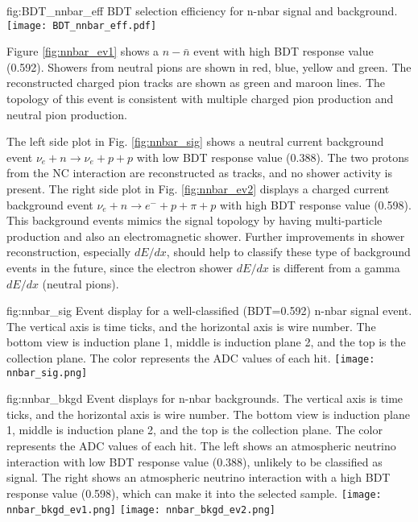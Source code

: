 \begin{dunefigure}
{fig:BDT_nnbar_eff}
{BDT selection efficiency for n-nbar signal and background.}
\texttt{[image: BDT\_nnbar\_eff.pdf]}
\end{dunefigure} 

Figure \ref{fig:nnbar_ev1} shows a $n-\bar{n}$ event with high BDT response value (0.592). Showers from neutral pions are shown in red, blue, yellow and green. The reconstructed charged pion tracks are shown as green and maroon lines. The topology of this event is consistent with multiple charged pion production and neutral pion production. 

The left side plot in Fig. \ref{fig:nnbar_sig} shows a neutral current background event $\nu_{e}+n\rightarrow \nu_{e}+p+p$ with low BDT response value (0.388). The two protons from the NC interaction are reconstructed as tracks, and no shower activity is present. The right side plot in Fig. \ref{fig:nnbar_ev2} displays a charged current background event $\nu_{e}+n\rightarrow {e}^{-}+p+\pi +p$ with high BDT response value (0.598). This background events mimics the signal topology by having multi-particle production and also an electromagnetic shower. Further improvements in shower reconstruction, especially $dE/dx$, should help to classify these type of background events in the future, since the electron shower $dE/dx$  is different from a gamma $dE/dx$ (neutral pions).

\begin{dunefigure}
{fig:nnbar_sig}
{Event display for a well-classified (BDT=0.592) n-nbar signal event.  The vertical axis is time ticks, and the horizontal axis is wire number.  The bottom view is induction plane 1, middle is induction plane 2, and the top is the collection plane.  The color represents the ADC values of each hit.}
\texttt{[image: nnbar\_sig.png]}
\end{dunefigure} 

\begin{dunefigure}
{fig:nnbar_bkgd}
{Event displays for n-nbar backgrounds.  The vertical axis is time ticks, and the horizontal axis is wire number.  The bottom view is induction plane 1, middle is induction plane 2, and the top is the collection plane.  The color represents the ADC values of each hit.  The left shows an atmospheric neutrino interaction with low BDT response value (0.388), unlikely to be classified as signal.  The right shows an atmospheric neutrino interaction with a high BDT response value (0.598), which can make it into the selected sample.}
\texttt{[image: nnbar\_bkgd\_ev1.png]}
\texttt{[image: nnbar\_bkgd\_ev2.png]}
\end{dunefigure} 

